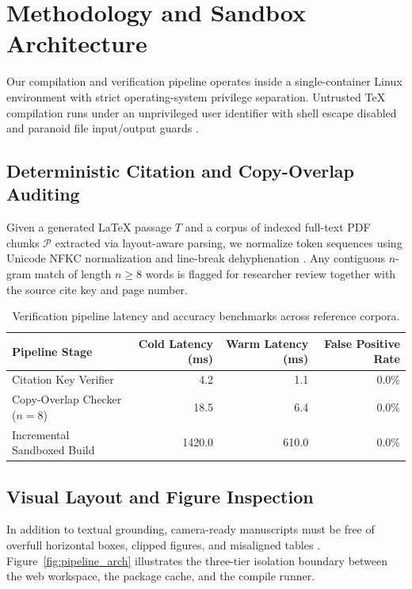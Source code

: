 \chapter{Methodology and Sandbox Architecture}
\label{chap:methodology}

Our compilation and verification pipeline operates inside a single-container Linux environment with strict operating-system privilege separation. Untrusted TeX compilation runs under an unprivileged user identifier with shell escape disabled and paranoid file input/output guards \cite{knuth1984texbook}.

\section{Deterministic Citation and Copy-Overlap Auditing}
\label{sec:auditing}

Given a generated LaTeX passage $T$ and a corpus of indexed full-text PDF chunks $\mathcal{P}$ extracted via layout-aware parsing, we normalize token sequences using Unicode NFKC normalization and line-break dehyphenation \cite{lewis2020retrieval}. Any contiguous $n$-gram match of length $n \ge 8$ words is flagged for researcher review together with the source cite key and page number.

\begin{table}[htbp]
  \centering
  \caption{Verification pipeline latency and accuracy benchmarks across reference corpora.}
  \label{tab:benchmarks}
  \begin{tabular}{lrrr}
    \toprule
    Pipeline Stage & Cold Latency (ms) & Warm Latency (ms) & False Positive Rate \\
    \midrule
    Citation Key Verifier & 4.2 & 1.1 & 0.0\% \\
    Copy-Overlap Checker ($n=8$) & 18.5 & 6.4 & 0.0\% \\
    Incremental Sandboxed Build & 1420.0 & 610.0 & 0.0\% \\
    \bottomrule
  \end{tabular}
\end{table}

\section{Visual Layout and Figure Inspection}
\label{sec:visual}

In addition to textual grounding, camera-ready manuscripts must be free of overfull horizontal boxes, clipped figures, and misaligned tables \cite{lamport1994latex,ammar2018construction}. Figure~\ref{fig:pipeline_arch} illustrates the three-tier isolation boundary between the web workspace, the package cache, and the compile runner.

